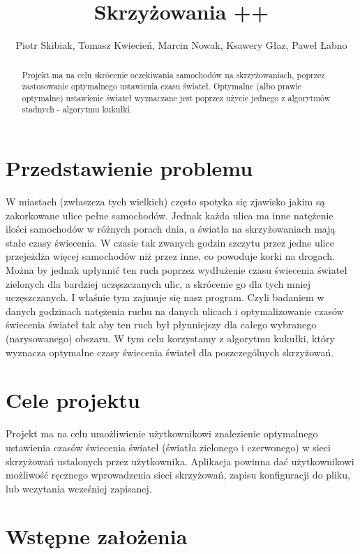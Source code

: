 \documentclass{article}
\title {Skrzyżowania ++}
\author{Piotr Skibiak, Tomasz Kwiecień, Marcin Nowak, Ksawery Głaz, Paweł Łabno}
\institute{AGH, Wydział IEiT, Informatyka}
\begin{document}
\maketitle

\begin{abstract}
Projekt ma na celu skrócenie oczekiwania samochodów na skrzyżowaniach, poprzez zastosowanie optymalnego ustawienia czasu świateł. Optymalne (albo prawie optymalne) ustawienie świateł wyznaczane jest poprzez użycie jednego z algorytmów stadnych - algorytmu kukułki.   
\end{abstract}

\newpage
\renewcommand*\contentsname{Spis Treści}
\tableofcontents
\setcounter{tocdepth}{3}

\newpage

\section{Przedstawienie problemu}
    W miastach (zwłaszcza tych wielkich) często spotyka się zjawisko jakim są zakorkowane ulice pełne samochodów. Jednak każda ulica ma inne natężenie ilości samochodów w różnych porach dnia, a światła na skrzyżowaniach mają stałe czasy świecenia. W czasie tak zwanych godzin szczytu przez jedne ulice przejeżdża więcej samochodów niż przez inne, co powoduje korki na drogach. Można by jednak upłynnić ten ruch poprzez wydłużenie czasu świecenia świateł zielonych dla bardziej uczęszczanych ulic, a skrócenie go dla tych mniej uczęszczanych. I właśnie tym zajmuje się nasz program. Czyli badaniem w danych godzinach natężenia ruchu na danych ulicach i optymalizowanie czasów świecenia świateł tak aby ten ruch był płynniejszy dla całego wybranego (narysowanego) obszaru. W tym celu korzystamy z algorytmu kukułki, który wyznacza optymalne czasy świecenia świateł dla poszczególnych skrzyżowań.


\section{Cele projektu}
    Projekt ma na celu umożliwienie użytkownikowi znalezienie optymalnego ustawienia czasów świecenia świateł (światła zielonego i czerwonego) w sieci skrzyżowań ustalonych przez użytkownika. Aplikacja powinna dać użytkownikowi możliwość ręcznego wprowadzenia sieci skrzyżowań, zapisu konfiguracji do pliku, lub wczytania wcześniej zapisanej. 

\section{Wstępne założenia}
\end{document}
